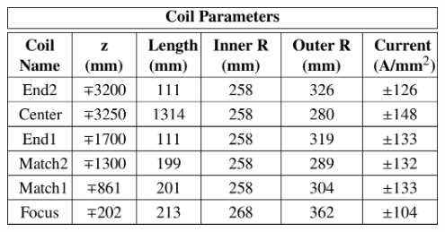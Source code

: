 \documentclass[portrait,a0paper,fontscale=0.285]{baposter} %
\begin{document}
\begin{poster}
{\begin{center} \includegraphics[width=0.95\textwidth]{Figures/coiltable} \end{center}
}



\end{poster}
\end{document}
